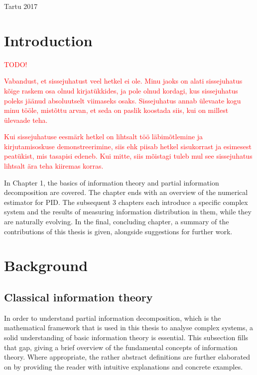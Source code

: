 \documentclass[12pt]{article}
\begin{document}
\vfill
\centerline{Tartu 2017}



\newpage
\tableofcontents

\newpage
\section{Introduction}


\textcolor{red}{TODO!}

\textcolor{red}{Vabandust, et sissejuhatust veel hetkel ei ole. Minu jaoks on alati sissejuhatus kõige raskem osa olnud kirjatükkides, ja pole olnud kordagi, kus sissejuhatus poleks jäänud absoluutselt viimaseks osaks. Sissejuhatus annab ülevaate kogu minu tööle, mistõttu arvan, et seda on paslik koostada siis, kui on millest ülevaade teha.}

\textcolor{red}{Kui sissejuhatuse eesmärk hetkel on lihtsalt töö läbimõtlemine ja kirjutamisoskuse demonstreerimine, siis ehk piisab hetkel sisukorrast ja esimesest peatükist, mis tasapisi edeneb. Kui mitte, siis mõistagi tuleb mul see sissejuhatus lihtsalt ära teha kiiremas korras.}


In Chapter 1, the basics of information theory and partial information decomposition are covered. The chapter ends with an overview of the numerical estimator for PID. The subsequent 3 chapters each introduce a specific complex system and the results of measuring information distribution in them, while they are naturally evolving. In the final, concluding chapter, a summary of the contributions of this thesis is given, alongside suggestions for further work. 

\newpage
\section{Background}

\subsection{Classical information theory}

In order to understand partial information decomposition, which is the mathematical framework that is used in this thesis to analyse complex systems, a solid understanding of basic information theory is essential. This subsection fills that gap, giving a brief overview of the fundamental concepts of information theory. Where appropriate, the rather abstract definitions are further elaborated on by providing the reader with intuitive explanations and concrete examples.
\end{document}
